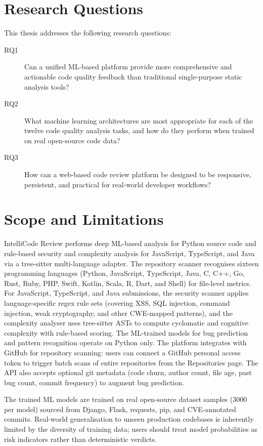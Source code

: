 \documentclass[12pt, oneside]{report}
\begin{document}
\section{Research Questions}
\label{sec:rq}

This thesis addresses the following research questions:

\begin{description}
  \item[RQ1] Can a unified ML-based platform provide more comprehensive and actionable
    code quality feedback than traditional single-purpose static analysis tools?
  \item[RQ2] What machine learning architectures are most appropriate for each of the
    twelve code quality analysis tasks, and how do they perform when trained on real
    open-source code data?
  \item[RQ3] How can a web-based code review platform be designed to be responsive,
    persistent, and practical for real-world developer workflows?
\end{description}

\section{Scope and Limitations}
\label{sec:scope}

IntelliCode Review performs deep ML-based analysis for Python source code and
rule-based security and complexity analysis for JavaScript, TypeScript, and Java via a
tree-sitter multi-language adapter. The repository scanner recognises sixteen programming
languages (Python, JavaScript, TypeScript, Java, C, C++, Go, Rust, Ruby, PHP, Swift,
Kotlin, Scala, R, Dart, and Shell) for file-level metrics. For JavaScript, TypeScript,
and Java submissions, the security scanner applies language-specific regex rule sets
(covering XSS, SQL injection, command injection, weak cryptography, and other CWE-mapped
patterns), and the complexity analyser uses tree-sitter ASTs to compute cyclomatic and
cognitive complexity with rule-based scoring. The ML-trained models for bug prediction
and pattern recognition operate on Python only. The platform integrates with GitHub for repository scanning: users
can connect a GitHub personal access token to trigger batch scans of entire repositories
from the Repositories page. The API also accepts optional git metadata (code churn, author
count, file age, past bug count, commit frequency) to augment bug prediction.

The trained ML models are trained on real open-source dataset samples (3000 per model)
sourced from Django, Flask, requests, pip, and CVE-annotated commits. Real-world
generalisation to unseen production codebases is inherently limited by the diversity of
training data; users should treat model probabilities as risk indicators rather than
deterministic verdicts.
\end{document}

